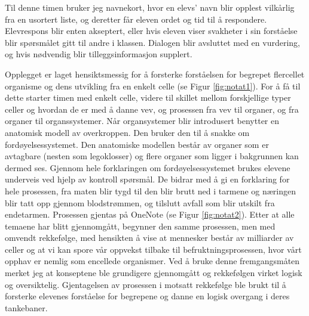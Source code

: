 \documentclass[main.tex]{subfiles}
\begin{document}
Til denne timen bruker jeg navnekort, hvor en elevs' navn blir opplest vilkårlig fra en usortert liste, og deretter får eleven 
ordet og tid til å respondere. Elevrespons blir enten akseptert, eller hvis eleven viser svakheter
i sin forståelse blir spørsmålet gitt til andre i klassen. Dialogen blir avsluttet med en vurdering,
og hvis nødvendig blir tilleggsinformasjon supplert. 

Opplegget er laget hensiktsmessig for å forsterke forståelsen for begrepet flercellet organisme og dens utvikling fra 
en enkelt celle (se Figur \ref{fig:notat1}). For å få til dette starter timen med 
enkelt celle, videre til skillet mellom forskjellige typer celler og hvordan de er med å danne 
vev, og prosessen fra vev til organer, og fra organer til organssystemer. Når organsystemer blir introdusert benytter 
en anatomisk modell av overkroppen. Den bruker den til å snakke om fordøyelsessystemet.
Den anatomiske modellen består av organer som er avtagbare (nesten som legoklosser) og flere organer 
som ligger i bakgrunnen kan dermed ses. Gjennom hele forklaringen om fordøyelsessystemet brukes
elevene underveis ved hjelp av kontroll spørsmål. De bidrar med å gi en forklaring for hele prosessen, 
fra maten blir tygd til den blir brutt ned i tarmene og næringen blir tatt opp gjennom blodstrømmen, 
og tilslutt avfall som blir utskilt fra endetarmen. Prosessen gjentas på OneNote (se Figur \ref{fig:notat2}). 
Etter at alle temaene har blitt gjennomgått, begynner den samme prosessen, 
men med omvendt rekkefølge, med hensikten å vise at mennesker består av milliarder av celler og 
at vi kan spore vår oppvekst tilbake til befruktningsprosessen, hvor vårt opphav er nemlig som
encellede organismer. Ved å bruke denne fremgangsmåten merket jeg at konseptene ble grundigere
gjennomgått og rekkefølgen virket logisk og oversiktelig. Gjentagelsen av prosessen i motsatt
rekkefølge ble brukt til å forsterke elevenes forståelse for begrepene og danne en logisk 
overgang i deres tankebaner. 



\end{document}
